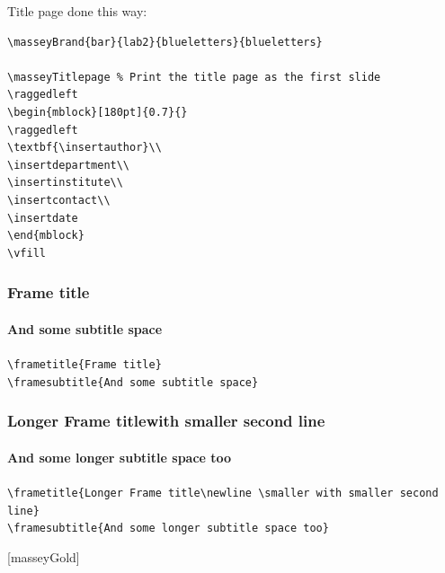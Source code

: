 \documentclass[10pt,aspectratio=169]{beamer}
\begin{document}
\begin{frame}[fragile]
Title page done this way:
\begin{verbatim}
\masseyBrand{bar}{lab2}{blueletters}{blueletters}

\masseyTitlepage % Print the title page as the first slide
\raggedleft
\begin{mblock}[180pt]{0.7}{}
\raggedleft
\textbf{\insertauthor}\\
\insertdepartment\\
\insertinstitute\\
\insertcontact\\
\insertdate
\end{mblock}
\vfill

\end{verbatim}

\end{frame}


\masseyBrand{}{}{}{}


\begin{frame}
\frametitle{Frame title}
\framesubtitle{And some subtitle space}

\verb|\frametitle{Frame title}|\\
\verb|\framesubtitle{And some subtitle space}|
\end{frame}

\begin{frame}
\frametitle{Longer Frame title\newline \smaller with smaller second line}
\framesubtitle{And some longer subtitle space too}

\verb|\frametitle{Longer Frame title\newline \smaller with smaller second line}|\\
\verb|\framesubtitle{And some longer subtitle space too}|
\end{frame}


[masseyGold]
\end{document}

